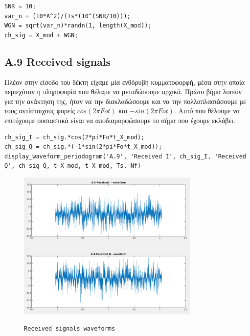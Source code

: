 \documentclass[11pt]{article}
\begin{document}
    \begin{lstlisting}[caption = {A.8 \texttt{}}]
% A.8
SNR = 10;
var_n = (10*A^2)/(Ts*(10^(SNR/10)));
WGN = sqrt(var_n)*randn(1, length(X_mod));
ch_sig = X_mod + WGN;
    \end{lstlisting}
    
    \subsection*{A.9 Received signals}
    Πλέον στην είσοδο του δέκτη είχαμε μία ενθόρυβη κυμματοφορφή, μέσα στην οποία περιεχόταν η πληροφορία που θέλαμε να μεταδώσουμε αρχικά.
    Πρώτο βήμα λοιπόν για την ανάκτηση της, ήταν να την διακλαδώσουμε και να την πολλαπλασιάσουμε με τους αντίστοιχους φορείς $cos(2 \pi Fo t)$ και $-sin(2 \pi Fo t)$.
    Αυτό που θέλουμε να επιτύχουμε ουσιαστικά είναι να αποδιαμορφώσουμε το σήμα που έχουμε εκλάβει. 
    
    \begin{lstlisting}[caption = {A.9 \texttt{}}]
% A.9
ch_sig_I = ch_sig.*cos(2*pi*Fo*t_X_mod);
ch_sig_Q = ch_sig.*(-1*sin(2*pi*Fo*t_X_mod));
display_waveform_periodogram('A.9', 'Received I', ch_sig_I, 'Received Q', ch_sig_Q, t_X_mod, t_X_mod, Ts, Nf)
    \end{lstlisting}
    
    \begin{figure}[H]
        \centering
        \includegraphics[scale=0.5, width=0.8\textwidth]{img/A9_rec_wave.png} \\
        \caption{\texttt{Received signals waveforms}}
    \end{figure}
    
\end{document}
